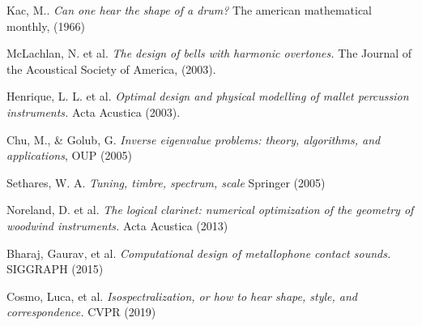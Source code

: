 \documentclass[a4paper,11pt]{article}
\begin{document}
    \vspace{-1.5em}
\renewcommand{\refname}{\normalsize Références}
%
\begin{thebibliography}{99}
\vspace{-1em}
{\scriptsize
{}
	Kac, M..
	{\it Can one hear the shape of a drum?}
	The american mathematical monthly, (1966)

	McLachlan, N. et al.
	{\it The design of bells with harmonic overtones.}
	The Journal of the Acoustical Society of America, (2003).

	Henrique, L. L. et al.
	{\it Optimal design and physical modelling of mallet percussion
	instruments.}
	Acta Acustica (2003).

	Chu, M., \& Golub, G.
	{\it Inverse eigenvalue problems: theory, algorithms, and
	applications}, OUP (2005)

	Sethares, W. A.
	{\it Tuning, timbre, spectrum, scale}
	Springer (2005)

	Noreland, D.  et al.
	{\it The logical clarinet: numerical optimization
	of the geometry of woodwind instruments.}
	Acta Acustica (2013)

	Bharaj, Gaurav, et al.
	{\it Computational design of metallophone contact sounds.}
	SIGGRAPH (2015)

	Cosmo, Luca, et al. 
	{\it Isospectralization, or how to hear shape, style, and
	correspondence.}
	CVPR (2019)

%
%
%
%
%
%
%
%


}
\end{thebibliography}
\end{document}
